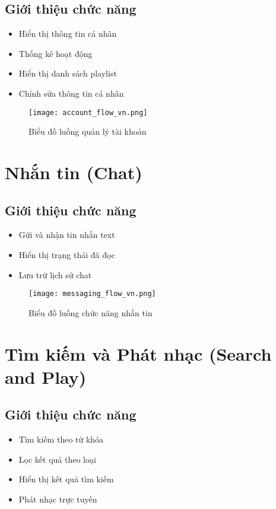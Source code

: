 \documentclass{book}
\let\oldsection\section
\renewcommand{\section}{\clearpage\oldsection}
\begin{document}
\subsection{Giới thiệu chức năng}
\begin{itemize}
    \item Hiển thị thông tin cá nhân
    \item Thống kê hoạt động
    \item Hiển thị danh sách playlist
    \item Chỉnh sửa thông tin cá nhân
\end{itemize}

\begin{figure}[htbp]
    \centering
    \texttt{[image: account\_flow\_vn.png]}
    \caption{Biểu đồ luồng quản lý tài khoản}
    \label{fig:account_flow}
\end{figure}

\section{Nhắn tin (Chat)}
\subsection{Giới thiệu chức năng}
\begin{itemize}
    \item Gửi và nhận tin nhắn text
    \item Hiển thị trạng thái đã đọc
    \item Lưu trữ lịch sử chat
\end{itemize}

\begin{figure}[htbp]
    \centering
    \texttt{[image: messaging\_flow\_vn.png]}
    \caption{Biểu đồ luồng chức năng nhắn tin}
    \label{fig:messaging_flow}
\end{figure}

\section{Tìm kiếm và Phát nhạc (Search and Play)}
\subsection{Giới thiệu chức năng}
\begin{itemize}
    \item Tìm kiếm theo từ khóa
    \item Lọc kết quả theo loại
    \item Hiển thị kết quả tìm kiếm
    \item Phát nhạc trực tuyến
\end{itemize}
\end{document}
